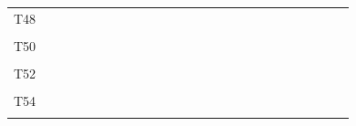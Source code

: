 \documentclass[
]{article}
\begin{document}
\begin{longtable}[l]{lllllllllllllllllllllllll}
T48 &  &  &  &  &  &  &  &  &  &  &  &  &  &  &  &  &  &  &  &  &  &  &  & \\
\cellcolor{gray!6}{T49} & \cellcolor{gray!6}{} & \cellcolor{gray!6}{} & \cellcolor{gray!6}{} & \cellcolor{gray!6}{} & \cellcolor{gray!6}{} & \cellcolor{gray!6}{} & \cellcolor{gray!6}{} & \cellcolor{gray!6}{} & \cellcolor{gray!6}{} & \cellcolor{gray!6}{} & \cellcolor{gray!6}{} & \cellcolor{gray!6}{} & \cellcolor{gray!6}{} & \cellcolor{gray!6}{} & \cellcolor{gray!6}{} & \cellcolor{gray!6}{} & \cellcolor{gray!6}{} & \cellcolor{gray!6}{} & \cellcolor{gray!6}{} & \cellcolor{gray!6}{} & \cellcolor{gray!6}{} & \cellcolor{gray!6}{} & \cellcolor{gray!6}{} & \cellcolor{gray!6}{}\\
T50 &  &  &  &  &  &  &  &  &  &  &  &  &  &  &  &  &  &  &  &  &  &  &  & \\
\addlinespace
\cellcolor{gray!6}{T51} & \cellcolor{gray!6}{} & \cellcolor{gray!6}{} & \cellcolor{gray!6}{} & \cellcolor{gray!6}{} & \cellcolor{gray!6}{} & \cellcolor{gray!6}{} & \cellcolor{gray!6}{} & \cellcolor{gray!6}{} & \cellcolor{gray!6}{} & \cellcolor{gray!6}{} & \cellcolor{gray!6}{} & \cellcolor{gray!6}{} & \cellcolor{gray!6}{} & \cellcolor{gray!6}{} & \cellcolor{gray!6}{} & \cellcolor{gray!6}{} & \cellcolor{gray!6}{} & \cellcolor{gray!6}{} & \cellcolor{gray!6}{} & \cellcolor{gray!6}{} & \cellcolor{gray!6}{} & \cellcolor{gray!6}{} & \cellcolor{gray!6}{} & \cellcolor{gray!6}{}\\
T52 &  &  &  &  &  &  &  &  &  &  &  &  &  &  &  &  &  &  &  &  &  &  &  & \\
\cellcolor{gray!6}{T53} & \cellcolor{gray!6}{} & \cellcolor{gray!6}{} & \cellcolor{gray!6}{} & \cellcolor{gray!6}{} & \cellcolor{gray!6}{} & \cellcolor{gray!6}{} & \cellcolor{gray!6}{} & \cellcolor{gray!6}{} & \cellcolor{gray!6}{} & \cellcolor{gray!6}{} & \cellcolor{gray!6}{} & \cellcolor{gray!6}{} & \cellcolor{gray!6}{} & \cellcolor{gray!6}{} & \cellcolor{gray!6}{} & \cellcolor{gray!6}{} & \cellcolor{gray!6}{} & \cellcolor{gray!6}{} & \cellcolor{gray!6}{} & \cellcolor{gray!6}{} & \cellcolor{gray!6}{} & \cellcolor{gray!6}{} & \cellcolor{gray!6}{} & \cellcolor{gray!6}{}\\
T54 &  &  &  &  &  &  &  &  &  &  &  &  &  &  &  &  &  &  &  &  &  &  &  & \\
\cellcolor{gray!6}{T55} & \cellcolor{gray!6}{} & \cellcolor{gray!6}{} & \cellcolor{gray!6}{} & \cellcolor{gray!6}{} & \cellcolor{gray!6}{} & \cellcolor{gray!6}{} & \cellcolor{gray!6}{} & \cellcolor{gray!6}{} & \cellcolor{gray!6}{} & \cellcolor{gray!6}{} & \cellcolor{gray!6}{} & \cellcolor{gray!6}{} & \cellcolor{gray!6}{} & \cellcolor{gray!6}{} & \cellcolor{gray!6}{} & \cellcolor{gray!6}{} & \cellcolor{gray!6}{} & \cellcolor{gray!6}{} & \cellcolor{gray!6}{} & \cellcolor{gray!6}{} & \cellcolor{gray!6}{} & \cellcolor{gray!6}{} & \cellcolor{gray!6}{} & \cellcolor{gray!6}{}\\

\end{longtable}
\end{document}
